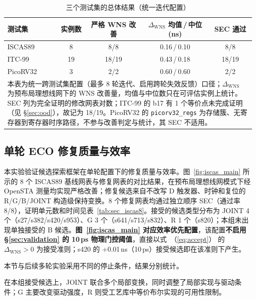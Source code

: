 \documentclass[twocolumn,10pt,fontset=windows]{ctexart}
\renewcommand{\eqref}[1]{\textup{（\ref{#1}）}}
\begin{document}
\begin{table}[!htb]
\centering
\caption{三个测试集的总体结果（统一迭代配置）}
\label{tab:overview}
\scriptsize
\setlength{\tabcolsep}{3pt}
\begin{tabular}{lcccc}
\toprule
\textbf{测试集} & \textbf{实例数} & \textbf{严格 WNS 改善} & \textbf{$\Delta_{\mathrm{WNS}}$ 均值\,/\,中位 (ns)} & \textbf{SEC 通过} \\
\midrule
ISCAS89  & 8  & 8/8   & 0.16\,/\,0.10 & 8/8 \\
ITC-99   & 19 & 18/19 & 0.43\,/\,0.18 & 18/19 \\
PicoRV32 & 3  & 2/2   & 0.60\,/\,0.60 & 2/2 \\
\bottomrule
\multicolumn{5}{p{0.95\columnwidth}}{\footnotesize 本表为统一跨测试集配置（最多 8 轮迭代、启用跨轮失效反馈）口径；$\Delta_{\mathrm{WNS}}$ 为预布局理想线网下的 WNS 改善量，均值与中位数只在可评估实例上统计。SEC 列为完全证明的修改网表对数；ITC-99 的 b17 有 1 个等价点未完成证明（见 \S\ref{sec:ood}），故记为 18/19。PicoRV32 的 \texttt{picorv32\_regs} 为存储簇、无寄存器到寄存器时序路径，不参与改善判定与统计，其 SEC 不适用。} \\
\end{tabular}
\end{table}

\subsection{单轮 ECO 修复质量与效率}\label{sec:iscas}

本实验验证候选探索框架在单轮配置下的修复质量与效率。图~\ref{fig:iscas_main} 所示的 8 个 ISCAS89 基线网表与修复网表的对比结果，在预布局理想线网模式下经 OpenSTA 测量均实现严格改善；修复候选来自不改写 D 触发器、时钟和复位的 R/G/B/JOINT 构造级保持变换。8 个修复网表均通过独立顺序 SEC（通过率 8/8），证明单元数和时间见表~\ref{tab:sec_iscas8}。接受的候选类型分布为 JOINT 4 个（s27/s382/s420/s953）、G 3 个（s641/s713/s832）、R 1 个（s820）；本组未出现单独接受的 B 候选。\textbf{图~\ref{fig:iscas_main} 对应效率优先配置}\label{sec:eff_prio}，该配置\textbf{不启用 \S\ref{sec:validation} 的 10\,ps 物理门控阈值}，直接以式~\eqref{eq:accept} 的 $\Delta_{\mathrm{WNS}}>0$ 为接受准则；s420 的 +0.01\,ns（10\,ps）接受候选即在该准则下产生。

本节与后续多轮实验采用不同的停止条件，结果分别统计。

在本组接受候选上，JOINT 联合多个局部变换，同时调整了局部实现与驱动条件；G 主要改变驱动强度，R 则受工艺库中等价布尔实现的可用性限制。
\end{document}
